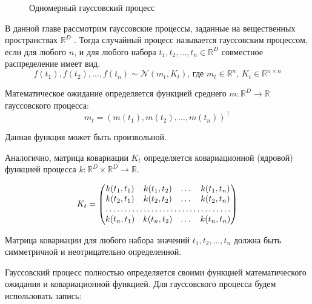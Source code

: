 \begin{figure}[H]
	\caption{Одномерный гауссовский процесс}
	\label{fig:gauss_process}
\end{figure}

В данной главе рассмотрим гауссовские процессы, заданные на вещественных пространствах $\mathbb{R}^D$ . Тогда случайный процесс называется гауссовским процессом, если для любого $n$, и для любого набора $t_1, t_2, \dots , t_n \in \mathbb{R}^D$ совместное распределение имеет вид.
$$
 f(t_1), f(t_2), \dots, f(t_n) \sim \mathcal{N}(m_t, K_t)
 \text{, где } m_t \in \mathbb{R}^n \text{, } K_t \in \mathbb{R}^{n \times n}
$$

Математическое ожидание определяется функцией среднего $m: \mathbb{R}^D \rightarrow \mathbb{R}$ гауссовского процесса:
$$
 m_t = (m(t_1),  m(t_2),  \dots, m(t_n))^{\top}
$$

Данная функция может быть произвольной.

Аналогично, матрица ковариации $K_t$ определяется ковариационной (ядровой) функцией процесса $k: \mathbb{R}^D \times \mathbb{R}^D \rightarrow \mathbb{R}$.

$$
 K_t =
 \begin{pmatrix}
 k(t_1, t_1)       & k(t_1, t_2) &  \dots & k(t_1, t_n) \\
 k(t_2, t_1)       & k(t_2, t_2) &  \dots & k(t_2, t_n) \\
 \hdotsfor{4} \\
 k(t_n, t_1)       & k(t_n, t_2) &  \dots & k(t_n, t_n)
 \end{pmatrix}
$$

Матрица ковариации для любого набора значений $t_1,  t_2, \dots, t_n$ должна быть симметричной и неотрицательно определенной.

Гауссовский процесс полностью определяется своими функцией математического ожидания и ковариационной функцией. Для гауссовского процесса будем использовать запись:

